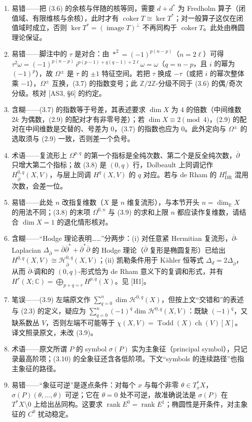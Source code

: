 \documentclass[11pt]{amsart}
\theoremstyle{definition}
\theoremstyle{remark}
\theoremstyle{plain}
\numberwithin{equation}{section}
\renewcommand{\:}{\colon}
\newcommand{\CC}{{\mathbb C}}
\newcommand{\RR}{{\mathbb R}}
\newcommand{\ZZ}{{\mathbb Z}}
\DeclareMathOperator{\ch}{ch}
\DeclareMathOperator{\coker}{coker}
\newcommand{\dbar}{{\overline\partial}}
\DeclareMathOperator{\rank}{rank}
\newcommand{\zmod}[1]{\ZZ/#1\ZZ}
\newcommand{\zt}{\zmod2}
\DeclareMathOperator{\Todd}{Todd}
\DeclareMathOperator{\image}{image}
\newcommand{\sH}{\mathscr{H}}
\begin{document}
\begin{enumerate}[leftmargin=2.2em,itemsep=2pt,topsep=2pt]
  \item 易错——把 (3.6) 的余核与伴随的核等同，需要 $d+d^*$ 为 Fredholm 算子（闭值域、有限维核与余核），此时才有 $\coker T\cong\ker T^*$；对一般算子这仅在闭值域时成立，否则 $\ker T^*=(\image T)^\perp$ 不再同构于 $\coker T$。此处由椭圆理论保证。
  \item 易错——脚注中的 $\tau$ 是对合：由 $*^2=(-1)^{p(n-p)}$（$n=2\ell$）可得 $\tau^2\omega=(-1)^{p(n-p)}\,i^{p(p-1)+q(q-1)+2\ell}\omega=\omega$（$q=n-p$，且 $i$ 的幂为 $(-1)^p$），故 $\Omega^\pm$ 是 $\tau$ 的 $\pm1$ 特征空间。若把 $\tau$ 换成 $-\tau$（或把 $i$ 的幂次整体乘 $-1$），$\Omega^\pm$ 互换，(3.7) 的指数变号；此 $\zt$-分级不同于 (3.6) 的偶/奇次分级。核对 [AS3, §6] 的约定。
  \item 含糊——(3.7) 的指数等于号差，其表述要求 $\dim X$ 为 $4$ 的倍数（中间维数 $2k$ 为偶数，(2.9) 的配对才有非零号差）；若 $\dim X\equiv2\pmod4$，(2.9) 的配对在中间维数是交替的、号差为 $0$，(3.7) 的指数也应为 $0$。此外定向与 $\Omega^\pm$ 的选取须与 (2.9) 一致，否则差一个负号。
  \item 术语——复流形上 $\Omega^{p,q}$ 的第一个指标是全纯次数、第二个是反全纯次数，$\dbar$ 只增大第二个指标；故 (3.8) 是 $(0,q)$ 行，Dolbeault 上同调记作 $H^{0,q}_{\dbar}(X,V)$，与层上同调 $H^q(X,V)$ 的 $q$ 对应。若与 de Rham 的 $H^q_{\text{DR}}$ 混用次数，会差一位。
  \item 易错——此处 $n$ 改指复维数（$X$ 是 $n$ 维复流形），与本节开头 $n=\dim_{\RR}X$ 的用法不同；(3.8) 的末项 $\Omega^{0,n}$ 与 (3.9) 的求和上限 $n$ 都应读作复维数，请结合 $\dim X=1$ 的退化情形核对。
  \item 含糊——“Hodge 理论表明……”分两步：(i) 对任意紧 Hermitian 复流形，$\dbar$-Laplacian $\Delta_{\dbar}=\dbar\dbar^*+\dbar^*\dbar$ 的 Hodge 理论（$\dbar$ 复形是椭圆复形）已给出 $H^{0,q}(X,V)\cong\sH^{0,q}_{\dbar}(X,V)$；(ii) 凯勒条件用于 Kähler 恒等式 $\Delta_d=2\Delta_{\dbar}$，从而 $\dbar$-调和的 $(0,q)$-形式恰为 de Rham 意义下的复调和形式，并有 $H^r(X;\CC)=\bigoplus_{p+q=r}H^{p,q}(X)$。见 [H1]。
  \item 笔误——(3.9) 左端原文作 $\sum_{q=0}^n\dim\sH^{0,q}(X)$，但按上文“交错和”的表述与 (2.3) 的定义，疑应为 $\sum_{q=0}^n(-1)^q\dim\sH^{0,q}(X,V)$：既缺 $(-1)^q$，又缺系数丛 $V$，否则左端不可能等于 $\chi(X,V)=\Todd(X)\ch(V)[X]$。译文照录原文，未改 (3.9)。
  \item 术语——原文所谓 $P$ 的 symbol $\sigma(P)$ 实为主象征（principal symbol），只记录最高阶项；(3.10) 的全象征还含各低阶项。下文“symbols 的连续路径”也指主象征的路径。
  \item 易错——“象征可逆”是逐点条件：对每个 $x$ 与每个非零 $\theta\in T^*_xX$，$\sigma(P)(\theta,\dots,\theta)$ 可逆；它在 $\theta=0$ 处不可逆，故准确说法是 $\sigma(P)$ 在 $T^*X\setminus0$ 上给出丛同构。这要求 $\rank E^0=\rank E^1$；椭圆性是开条件，对主象征的 $C^0$ 扰动稳定。

\end{enumerate}
\end{document}
